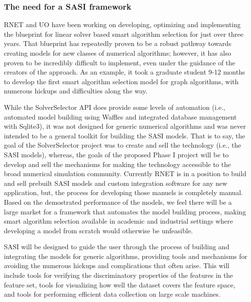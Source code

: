 \subsubsection{The need for a SASI framework} 

RNET and UO have been working on developing, optimizing and implementing the blueprint for linear solver based smart algorithm selection for just over three years. That blueprint has repeatedly proven to be a robust pathway towards creating models for new classes of numerical algorithms; however, it has also proven to be incredibly difficult to implement, even under the guidance of the creators of the approach. As an example, it took a graduate student 9-12 months to develop the first smart algorithm selection model for graph algorithms, with numerous hickups and difficulties along the way. 

While the SolverSelector API does provide some levels of automation (i.e., automated model building using Waffles and integrated database management with Sqlite3), it was not designed for generic numerical algorithms and was never intended to be a general toolkit for building the SASI models. That is to say, the goal of the SolverSelector project was to create and sell the technology (i.e., the SASI models), whereas, the goals of the proposed Phase I project will be to develop and sell the mechanisms for making the technology accessible to the broad numerical simulation community. Currently RNET is in a position to build and sell prebuilt SASI models and custom integration software for any new application, but, the process for developing those manuels is completely manual. Based on the demostrated performance of the models, we feel there will be a large market for a framework that automates the model building process, making smart algorithm selection available in academic and industrial settings where developing a model from scratch would otherwise be unfeasible.  

SASI will be designed to guide the user through the process of building and integrating the models for generic algorithms, providing tools and mechanisms for avoiding the numerous hickups and complications that often arise. This will include tools for verifying the discriminatory properties of the features in the feature set, tools for visualizing how well the dataset covers the feature space, and tools for performing efficient data collection on large scale machines. 

